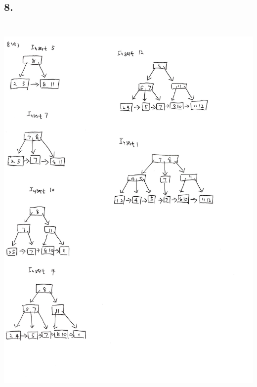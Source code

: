 \documentclass[10pt]{article}
\begin{document}
\subsection*{8.}

\includegraphics[width=15cm, height=20cm]{8_a}
\end{document}
